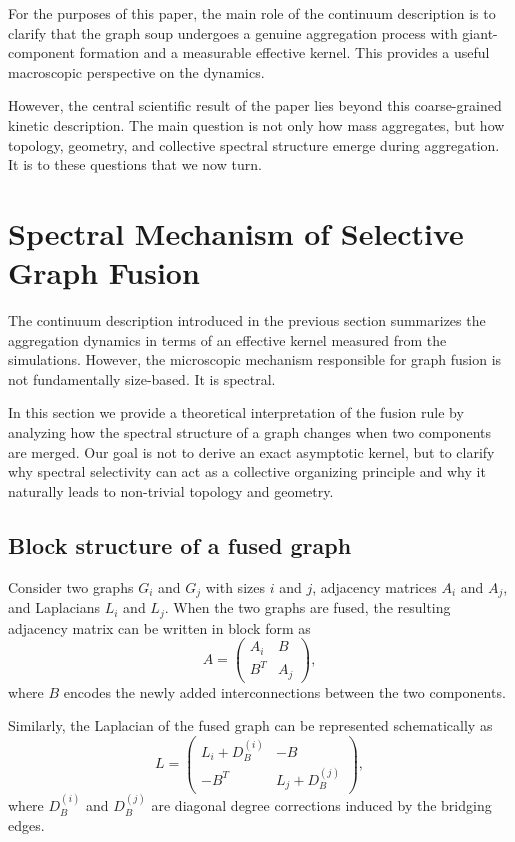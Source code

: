 \documentclass[11pt]{article}
\begin{document}
For the purposes of this paper, the main role of the continuum description is to clarify that the graph soup undergoes a genuine aggregation process with giant-component formation and a measurable effective kernel.
This provides a useful macroscopic perspective on the dynamics.

However, the central scientific result of the paper lies beyond this coarse-grained kinetic description.
The main question is not only how mass aggregates, but how topology, geometry, and collective spectral structure emerge during aggregation.
It is to these questions that we now turn.
\section{Spectral Mechanism of Selective Graph Fusion}

The continuum description introduced in the previous section summarizes the aggregation dynamics in terms of an effective kernel measured from the simulations.
However, the microscopic mechanism responsible for graph fusion is not fundamentally size-based.
It is spectral.

In this section we provide a theoretical interpretation of the fusion rule by analyzing how the spectral structure of a graph changes when two components are merged.
Our goal is not to derive an exact asymptotic kernel, but to clarify why spectral selectivity can act as a collective organizing principle and why it naturally leads to non-trivial topology and geometry.

\subsection{Block structure of a fused graph}

Consider two graphs $G_i$ and $G_j$ with sizes $i$ and $j$, adjacency matrices $A_i$ and $A_j$, and Laplacians $L_i$ and $L_j$.
When the two graphs are fused, the resulting adjacency matrix can be written in block form as
\[
A =
\begin{pmatrix}
A_i & B \\
B^T & A_j
\end{pmatrix},
\]
where $B$ encodes the newly added interconnections between the two components.

Similarly, the Laplacian of the fused graph can be represented schematically as
\[
L =
\begin{pmatrix}
L_i + D_B^{(i)} & -B \\
-B^T & L_j + D_B^{(j)}
\end{pmatrix},
\]
where $D_B^{(i)}$ and $D_B^{(j)}$ are diagonal degree corrections induced by the bridging edges.
\end{document}
